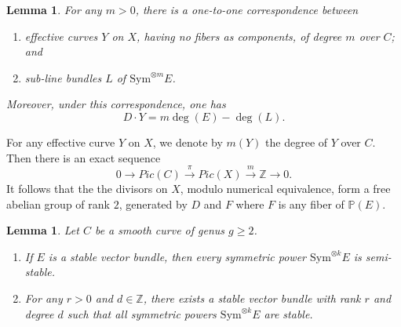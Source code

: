 \documentclass[english,reqno]{amsart}
\newcommand\bbP{{\mathbb P}}
\newcommand\bbZ{{\mathbb Z}}
\theoremstyle{plain}
\newtheorem{lemma}[thm]{Lemma}
\theoremstyle{definition}
\numberwithin{equation}{section} %
\begin{document}
\begin{lemma}\cite[Chapter I, Proposition~ 10.8]{Hartshorne1970}\label{examplelemma} For any $m>0$, there is a one-to-one
correspondence between \begin{enumerate}
\item effective curves $Y$ on $X$, having no fibers as components,
of degree $m$ over $C$; and

\item sub-line bundles $L$ of $\mathrm{Sym}^{\otimes m} E$. \end{enumerate} Moreover, under this
correspondence, one has \begin{equation} D\cdot Y=
m\deg(E)-\deg(L)\label{examplekey}.\end{equation}\end{lemma}



\noindent For any effective curve $Y$ on
$X$, we denote by $m(Y)$ the degree of $Y$ over $C$. Then there
is an exact sequence
$$  0\rightarrow Pic(C)\stackrel{\pi}{\rightarrow}Pic(X)\stackrel{m}{\rightarrow}\bbZ\rightarrow0.$$
It follows that the the divisors on $X$, modulo numerical
equivalence, form a free abelian group of rank $2$, generated by $D$
and $F$ where $F$ is any fiber of $\bbP(E)$.



\begin{lemma}\cite[Chapter I, Theorem~ 10.5]{Hartshorne1970}  Let $C$ be a smooth curve of genus $g\geq  2$. \begin{enumerate}
\item    If $E$ is a stable vector bundle,  then every symmetric power $\mathrm{Sym}^{\otimes k}E$ is   semi-stable.

    \item  For any $r>0$ and $d\in \bbZ$, there exists a stable vector bundle with rank $r$ and degree $d$ such that all symmetric powers $\mathrm{Sym}^{\otimes k} E$ are stable.
\end{enumerate}
\end{lemma}
\end{document}

